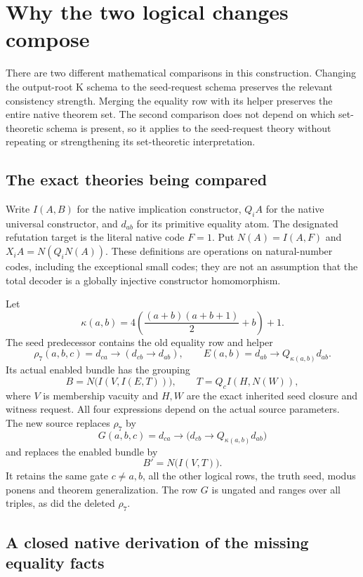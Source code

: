 \section{Why the two logical changes compose}
\label{sec:composition-audit}

There are two different mathematical comparisons in this construction.
Changing the output-root K schema to the seed-request schema preserves
the relevant consistency strength.  Merging the equality row with its
helper preserves the entire native theorem set.  The second comparison
does not depend on which set-theoretic schema is present, so it applies
to the seed-request theory without repeating or strengthening its
set-theoretic interpretation.

\subsection{The exact theories being compared}

Write $I(A,B)$ for the native implication constructor, $Q_i A$ for the
native universal constructor, and $d_{ab}$ for its primitive equality
atom.  The designated refutation target is the literal native code
$F=1$.  Put $N(A)=I(A,F)$ and $X_iA=N(Q_iN(A))$.  These definitions are
operations on natural-number codes, including the exceptional small
codes; they are not an assumption that the total decoder is a globally
injective constructor homomorphism.

Let
\[
 \kappa(a,b)=4\left(\frac{(a+b)(a+b+1)}2+b\right)+1.
\]
The seed predecessor contains the old equality row and helper
\[
 \rho_7(a,b,c)=d_{ca}\to(d_{cb}\to d_{ab}),
 \qquad E(a,b)=d_{ab}\to Q_{\kappa(a,b)}d_{ab}.
\]
Its actual enabled bundle has the grouping
\[
 B=N\bigl(I(V,I(E,T))\bigr),\qquad
 T=Q_c I(H,N(W)),
\]
where $V$ is membership vacuity and $H,W$ are the exact inherited seed
closure and witness request.  All four expressions depend on the actual
source parameters.  The new source replaces $\rho_7$ by
\[
 G(a,b,c)=d_{ca}\to
       \bigl(d_{cb}\to Q_{\kappa(a,b)}d_{ab}\bigr)
\]
and replaces the enabled bundle by
\[
 B'=N\bigl(I(V,T)\bigr).
\]
It retains the same gate $c\ne a,b$, all the other logical rows, the
truth seed, modus ponens and theorem generalization.  The row $G$ is
ungated and ranges over all triples, as did the deleted $\rho_7$.

\subsection{A closed native derivation of the missing equality facts}

